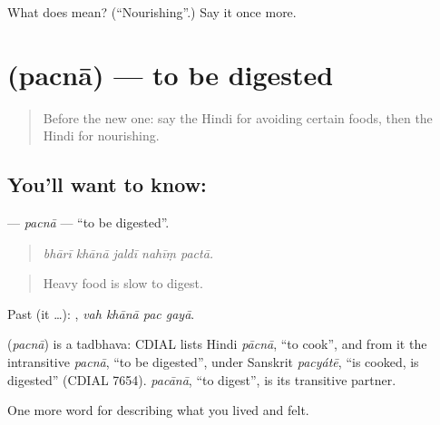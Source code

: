 \begin{tcolorbox}[breakable,colback=teal!4,colframe=teal!35!black,title={Before you move on}]
What does  mean? (\textquotedblleft{}Nourishing\textquotedblright{}.) Say it once more.
\end{tcolorbox}
\section[\texorpdfstring{\hi{पचना} (pacnā)}{पचना (pacnā)}]{ (pacnā) — to be digested}

\label{lesson:HI-C495-pacna}



\begin{quote}
Before the new one: say the Hindi for avoiding certain foods, then the Hindi for nourishing.
\end{quote}

\subsection*{You'll want to know: }
\textbf{} — \emph{pacnā} — \textquotedblleft{}to be digested\textquotedblright{}.

\begin{quote}
    
\end{quote}

\begin{quote}
\emph{bhārī khānā jaldī nahīṃ pactā.}
\end{quote}

\begin{quote}
Heavy food is slow to digest.
\end{quote}

Past (it …):    , \emph{vah khānā pac gayā}.

\begin{cousinweb}
\textbf{} (\emph{pacnā}) is a tadbhava: CDIAL lists Hindi \emph{pācnā}, \textquotedblleft{}to cook\textquotedblright{}, and from it the intransitive \emph{pacnā}, \textquotedblleft{}to be digested\textquotedblright{}, under Sanskrit \emph{pacyátē}, \textquotedblleft{}is cooked, is digested\textquotedblright{} (CDIAL 7654). \emph{pacānā}, \textquotedblleft{}to digest\textquotedblright{}, is its transitive partner.
\end{cousinweb}

\begin{grammarlens}[title={What you've built}]
One more word for describing what you lived and felt.
\end{grammarlens}

